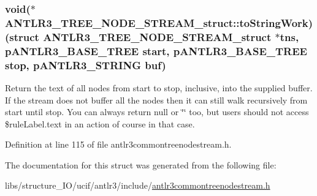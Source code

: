 \hypertarget{struct_a_n_t_l_r3___t_r_e_e___n_o_d_e___s_t_r_e_a_m__struct_abd8afe607714bab5b88c99746f60e4c5}{
\subsubsection[{to\-String\-Work}]{\setlength{\rightskip}{0pt plus 5cm}void($\ast$ A\-N\-T\-L\-R3\-\_\-\-T\-R\-E\-E\-\_\-\-N\-O\-D\-E\-\_\-\-S\-T\-R\-E\-A\-M\-\_\-struct\-::to\-String\-Work)(struct {\bf A\-N\-T\-L\-R3\-\_\-\-T\-R\-E\-E\-\_\-\-N\-O\-D\-E\-\_\-\-S\-T\-R\-E\-A\-M\-\_\-struct} $\ast$tns, {\bf p\-A\-N\-T\-L\-R3\-\_\-\-B\-A\-S\-E\-\_\-\-T\-R\-E\-E} start, {\bf p\-A\-N\-T\-L\-R3\-\_\-\-B\-A\-S\-E\-\_\-\-T\-R\-E\-E} stop, {\bf p\-A\-N\-T\-L\-R3\-\_\-\-S\-T\-R\-I\-N\-G} {\bf buf})}}\label{struct_a_n_t_l_r3___t_r_e_e___n_o_d_e___s_t_r_e_a_m__struct_abd8afe607714bab5b88c99746f60e4c5}
Return the text of all nodes from start to stop, inclusive, into the supplied buffer. If the stream does not buffer all the nodes then it can still walk recursively from start until stop. You can always return null or \char`\"{}\char`\"{} too, but users should not access \$rule\-Label.\-text in an action of course in that case. 

Definition at line 115 of file antlr3commontreenodestream.\-h.



The documentation for this struct was generated from the following file\-:\begin{DoxyCompactItemize}
\item 
libs/structure\-\_\-\-I\-O/ucif/antlr3/include/\hyperlink{antlr3commontreenodestream_8h}{antlr3commontreenodestream.\-h}\end{DoxyCompactItemize}
